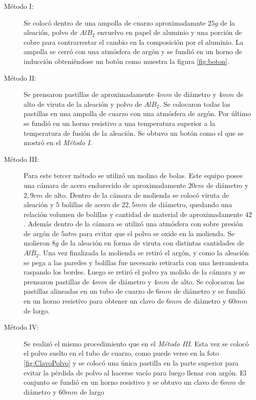 \documentclass[a4paper,12pt,fleqn,twoside,openany]{book}
\begin{document}
\begin{description}
\item[Método I:] Se colocó dentro de una ampolla de cuarzo aproximadamnte $25 g$ de la aleación, polvo de $AlB_2$ envuelvo en papel de aluminio y una porción de 
cobre para contrarrestar el cambio en la composición por el aluminio. La ampolla se cerró con una atmósfera de argón y se fundió en un horno de inducción obteniéndose un botón como muestra la figura \ref{fig:boton}.

\item[Método II:] Se prensaron pastillas de aproximadamente $4 mm$ de diámetro y $4 mm$ de alto de viruta de la aleación y polvo de $AlB_2$. Se 
colocaron todas las pastillas en una ampolla de cuarzo con una atmósfera de argón. Por último se fundió en un horno resistivo a una temperatura superior 
a la temperatura de fusión de la aleación. Se obtuvo un botón como el que se mostró en el \textsl{Método I}.

\item[Método III:] Para este tercer método se utilizó un molino de bolas. Este equipo posee una cámara de acero endurecido de aproximadamente $20 cm$ de diámetro y $2,9 cm$ de alto. Dentro de la cámara de molienda se colocó viruta de aleación y $5$ bolillas de acero de $22,5 mm$ de diámetro, quedando una relación volumen de bolillas y cantidad de material de aproximadamente $42$. Además dentro de la cámara se utilizó una atmósfera con sobre presión de argón de $5 atm$ para evitar que el polvo se oxide en la molienda.
Se molieron $8g$ de la aleación en forma de viruta con distintas cantidades de $AlB_2$.  Una vez finalizada la molienda se retiró el argón, y 
como la aleación se pega a las paredes y bolillas fue necesario retirarla con una herramienta raspando los bordes.
Luego se retiró el polvo ya molido de la cámara y se prensaron pastillas de $4mm$ de diámetro y $4mm$ de alto. Se colocaron las pastillas alineadas en un tubo de cuarzo de $6 mm$ de diámetro y se fundió en un horno resistivo para obtener un clavo de $6 mm$ de diámetro y $60 mm$ de largo.

\item[Método IV:] Se realizó el mismo procedimiento que en el \textsl{Método III}. Esta vez se colocó el polvo suelto en el tubo de cuarzo, como puede verse en la foto \ref{fig:ClavoPolvo} y se colocó una única pastilla en la parte superior para evitar la pérdida de polvo al hacerse vacío para luego llenar con argón. El conjunto se fundió en un horno resistivo y se obtuvo un clavo de $6 mm$ de diámetro y $60 mm$ de largo 
\end{description}
\end{document}
